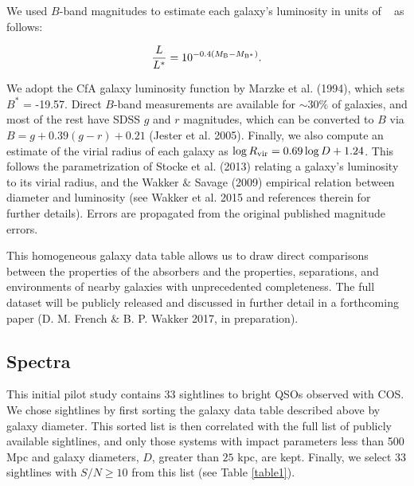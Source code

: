 We used $B$-band magnitudes to estimate each galaxy's luminosity in units of \Lstar~ as follows:

\begin{equation}
	\frac{L}{L^*} = 10^{-0.4 (M_{\rm B} - M_{\rm B^{*}})}.
\end{equation}

We adopt the CfA galaxy luminosity function by Marzke et al. (1994), which sets $B^{*} $ = -19.57. Direct $B$-band measurements are available for $\sim 30\%$ of galaxies, and most of the rest have SDSS $g$ and $r$ magnitudes, which can be converted to $B$ via $B = g + 0.39 (g-r) + 0.21$ (Jester et al. 2005). Finally, we also compute an estimate of the virial radius of each galaxy as $\log R_{\rm vir} = 0.69 \log D + 1.24$. This follows the parametrization of Stocke et al. (2013) relating a galaxy's luminosity to its virial radius, and the Wakker $\&$ Savage (2009) empirical relation between diameter and luminosity (see Wakker et al. 2015 and references therein for further details). Errors are propagated from the original published magnitude errors.

This homogeneous galaxy data table allows us to draw direct comparisons between the properties of the absorbers and the properties, separations, and environments of nearby galaxies with unprecedented completeness. The full dataset will be publicly released and discussed in further detail in a forthcoming paper (D. M. French $\&$ B. P. Wakker 2017, in preparation).


\subsection{Spectra}

This initial pilot study contains 33 sightlines to bright QSOs observed with COS. We chose sightlines by first sorting the galaxy data table described above by galaxy diameter. This sorted list is then correlated with the full list of publicly available sightlines, and only those systems with impact parameters less than 500 Mpc and galaxy diameters, $D$, greater than $25$ kpc, are kept. Finally, we select 33 sightlines with $S/N \geq 10$ from this list (see Table \ref{table1}).

